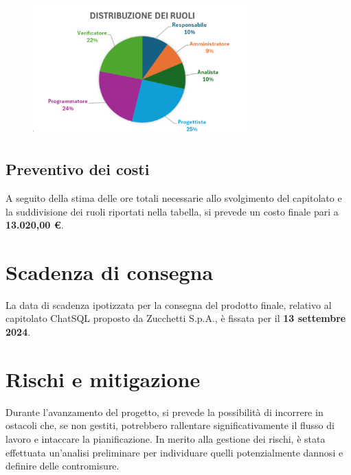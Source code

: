 \begin{figure}[H]
  \centering
  \includegraphics[width=0.75\textwidth]{assets/piechart.png}
\end{figure}

\subsection{Preventivo dei costi}
A seguito della stima delle ore totali necessarie allo svolgimento del capitolato e la suddivisione dei ruoli riportati nella tabella, si prevede un costo finale pari a \textbf{13.020,00 €}.

\section{Scadenza di consegna}
La data di scadenza ipotizzata per la consegna del prodotto finale, relativo al capitolato ChatSQL proposto da Zucchetti S.p.A., è fissata per il \textbf{13 settembre 2024}.

\section{Rischi e mitigazione}
Durante l’avanzamento del progetto, si prevede la possibilità di incorrere in ostacoli che, se non gestiti, potrebbero rallentare significativamente il flusso di lavoro e intaccare la pianificazione. In merito alla gestione dei rischi, è stata effettuata un’analisi preliminare per individuare quelli potenzialmente dannosi e definire delle contromisure.

